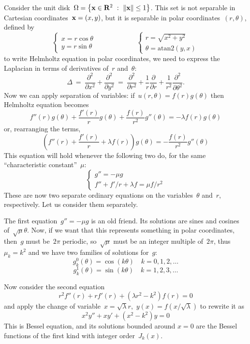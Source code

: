 Consider the unit disk~$\Omega=\left\{\mathbf{x}\in\mathbf{R}^2\ :\
\|\mathbf{x}\|\le1\right\}$.  This set is not separable in Cartesian
coordinates~$\mathbf{x}=(x,y)$, but it is separable in polar
coordinates~$(r,\theta)$, defined by
\[
	\begin{cases}
		x = r\cos\theta \\
		y = r\sin\theta
	\end{cases}
	\qquad\qquad
	\qquad
	\begin{cases}
		r = \sqrt{x^2+y^2} \\
		\theta = \mathrm{atan2}(y,x)
	\end{cases}
\]
to write Helmholtz equation in polar coordinates, we need to
express the Laplacian in terms of derivatives of~$r$ and~$\theta$:
\[
	\Delta
	\ = \ %
	\frac{\partial^2}{\partial x^2}
	+
	\frac{\partial^2}{\partial y^2}
	\ = \ %
	\frac{\partial^2}{\partial r^2}
	+
	\frac 1r
	\frac{\partial}{\partial r}
	+
	\frac 1{r^2}
	\frac{\partial^2}{\partial \theta^2}.
\]
Now we can apply separation of variables:
if~$u(r,\theta)=f(r)g(\theta)$ then Helmholtz equation becomes
\[%
f''(r)g(\theta)+\frac{f'(r)}rg(\theta)+\frac{f(r)}{r^2}g''(\theta)
=-\lambda f(r)g(\theta)
\]
or, rearranging the terms,
\[
	\left(
f''(r)
+
\frac{f'(r)}r
+\lambda f(r)
\right)g(\theta)
=
-
\frac{f(r)}{r^2}g''(\theta)
\]
This equation will hold whenever the following two do, for the same
``characteristic constant''~$\mu$:
\[
	\begin{cases}
		g''=-\mu g \\
		f''+{f'}/{r}+\lambda f = \mu{f}/{r^2}
	\end{cases}
\]
These are now two separate ordinary equations on the
variables~$\theta$ and~$r$, respectively.  Let us consider them
separately.

The first equation~$g''=-\mu g$ is an old friend.  Its solutions are
sines and cosines of~$\sqrt{\mu}\theta$.  Now, if we want that this
represents something in polar coordinates, then~$g$ must be~$2\pi$
periodic, so~$\sqrt{\mu}$ must be an integer multiple of~$2\pi$,
thus~$\mu_k=k^2$ and we have two families of solutions
for~$g$:
\[
	g^0_k(\theta) = \cos(k \theta)
	\quad k=0,1,2,\ldots
\]
\[
	g^1_k(\theta) = \sin(k \theta)
	\quad k=1,2,3,\ldots
\]

Now consider the second equation
\[
	r^2f''(r) + rf'(r)
	+\left(\lambda r^2
		-
	k^2
	\right)f(r) = 0
\]
and apply the change of variable~$x=\sqrt\lambda
r$,~$y(x)=f\left(x/\sqrt\lambda\right)$ to rewrite it as
\[
		x^2y''+xy'+\left(x^2-
	k^2\right)y=0
\]
This is Bessel equation, and its solutions bounded around $x=0$ are
the Bessel functions of the first kind with integer order~$J_k(x)$.

